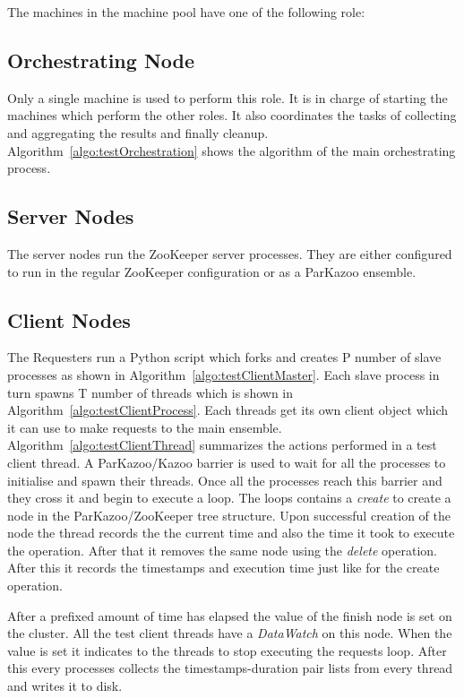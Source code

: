 The machines in the machine pool have one of the following role:
\subsection{Orchestrating Node}
Only a single machine is used to perform this role. It is in charge of starting the machines which perform the other roles. It also coordinates the tasks of collecting and aggregating the results and finally cleanup. Algorithm~\ref{algo:testOrchestration} shows the algorithm of the main orchestrating process.
\subsection{Server Nodes}
The server nodes run the ZooKeeper server processes. They are either configured to run in the regular ZooKeeper configuration or as a ParKazoo ensemble.
\subsection{Client Nodes}
The Requesters run a Python script which forks and creates P number of slave processes as shown in Algorithm~\ref{algo:testClientMaster}. Each slave process in turn spawns T number of threads which is shown in Algorithm~\ref{algo:testClientProcess}. Each threads get its own client object which it can use to make requests to the main ensemble. Algorithm~\ref{algo:testClientThread} summarizes the actions performed in a test client thread. A ParKazoo/Kazoo barrier is used to wait for all the processes to initialise and spawn their threads. Once all the processes reach this barrier and they cross it and begin to execute a loop. The loops contains a \textit{create} to create a node in the ParKazoo/ZooKeeper tree structure. Upon successful creation of the node the thread records the the current time and also the time it took to execute the operation. After that it removes the same node using the \textit{delete} operation. After this it records the timestamps and execution time just like for the create operation.

After a prefixed amount of time has elapsed the value of the finish node is set on the cluster. All the test client threads have a \textit{DataWatch} on this node. When the value is set it indicates to the threads to stop executing the requests loop. After this every processes collects the timestamps-duration pair lists from every thread and writes it to disk. 




